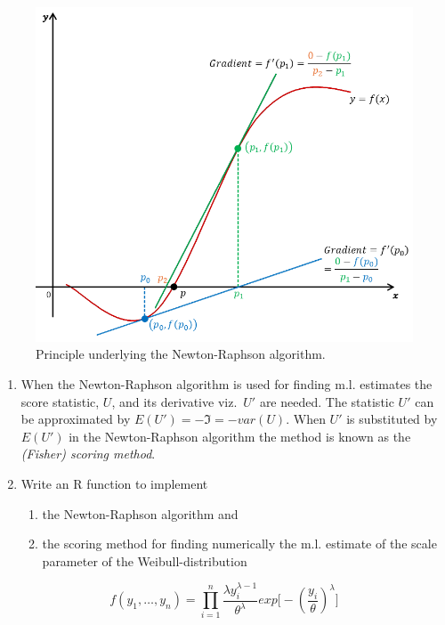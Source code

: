 \documentclass[
]{book}
\providecommand{\tightlist}{%
  \setlength{\itemsep}{0pt}\setlength{\parskip}{0pt}}
\begin{document}
\begin{figure}
\includegraphics[width=1\linewidth]{pics/NewtonRaphson} \caption{Principle underlying the Newton-Raphson algorithm.}\label{fig:NewtonRaphson}
\end{figure}

\begin{enumerate}
\def\labelenumi{(\alph{enumi})}
\item
  When the Newton-Raphson algorithm is used for finding m.l. estimates the score statistic, \(U\), and its derivative viz.~\(U'\) are needed. The statistic \(U'\) can be approximated by \(E(U') = -\mathfrak{I} = -var(U)\). When \(U'\) is substituted by \(E(U')\) in the Newton-Raphson algorithm the method is known as the \emph{{(Fisher) scoring method}}.
\item
  Write an R function to implement

  \begin{enumerate}
  \def\labelenumii{(\roman{enumii})}
  \tightlist
  \item
    the Newton-Raphson algorithm and
  \item
    the scoring method for finding numerically the m.l. estimate of the scale\\
    parameter of the Weibull-distribution
  \end{enumerate}
\end{enumerate}

\[
f(y_1, \dots, y_n) = \prod_{i=1}^{n}{\frac{\lambda y_i^{\lambda-1}}{\theta^\lambda}exp \big[-(\frac{y_i}{\theta})^\lambda \big]}
\]
\end{document}
